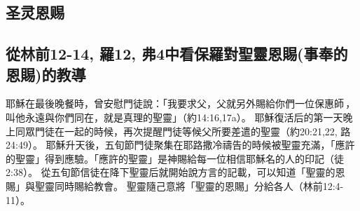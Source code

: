 \subsection{圣灵恩赐}



\subsection{從林前12-14, 羅12, 弗4中看保羅對聖靈恩賜(事奉的恩賜)的教導}

耶穌在最後晚餐時，曾安慰門徒說：「我要求父，父就另外賜給你們一位保惠師 ，叫他永遠與你們同在，就是真理的聖靈」（約14:16,17a）。
耶穌復活后的第一天晚上同眾門徒在一起的時候，再次提醒門徒等候父所要差遣的聖靈（約20:21,22, 路24:49）。
耶穌升天後，五旬節門徒聚集在耶路撒冷禱告的時候被聖靈充滿，「應許的聖靈」得到應驗。「應許的聖靈」是神賜給每一位相信耶穌名的人的印記（徒2:38）。
從五旬節信徒在降下聖靈后就開始說方言的記載，可以知道「聖靈的恩賜」與聖靈同時賜給教會。
聖靈隨己意將「聖靈的恩賜」分給各人（林前12:4-11）。 

